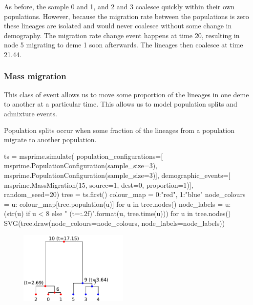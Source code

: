 \documentclass[graybox]{svmult}
\newcommand{\includenbimage}[1]{\begin{center}\texttt{[image: \#1]}\end{center}}
\begin{document}
    As before, the sample 0 and 1, and 2 and 3 coalesce quickly within their
own populations. However, because the migration rate between the
populations is zero these lineages are isolated and would never coalesce
without some change in demography. The migration rate change event
happens at time 20, resulting in node 5 migrating to deme 1 soon
afterwards. The lineages then coalesce at time 21.44.

\subsubsection{Mass migration}\label{mass-migration}

This class of event allows us to move some proportion of the lineages in
one deme to another at a particular time. This allows us to model
population splits and admixture events.

Population splits occur when some fraction of the lineages from a
population migrate to another population.

\begin{pythoncode}
ts  = msprime.simulate(
    population_configurations=[
        msprime.PopulationConfiguration(sample_size=3),
        msprime.PopulationConfiguration(sample_size=3)],
    demographic_events=[
        msprime.MassMigration(15, source=1, dest=0, proportion=1)],
    random_seed=20)
tree = ts.first()
colour_map = {0:"red", 1:"blue"}
node_colours = {u: colour_map[tree.population(u)] for u in tree.nodes()}
node_labels = {
    u: (str(u) if u < 8 else "{} (t={:.2f})".format(u, tree.time(u)))
    for u in tree.nodes()}
SVG(tree.draw(node_colours=node_colours, node_labels=node_labels))
\end{pythoncode}


\begin{figure}
  \begin{center}
    \includegraphics[width=0.48\textwidth]{images/simulations_37_0}
  \end{center}
\end{figure}
\end{document}
